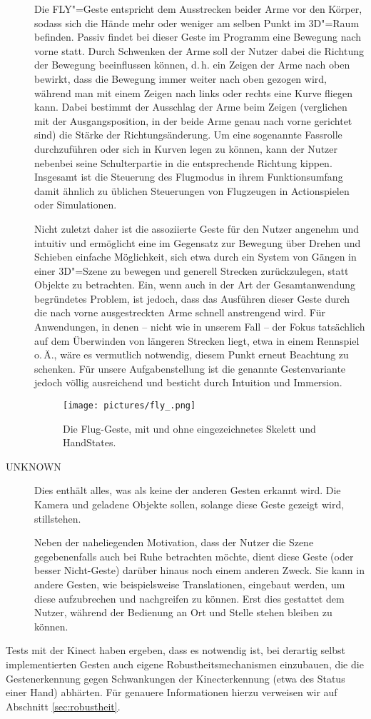 \begin{description}
		Die FLY"=Geste entspricht dem Ausstrecken beider Arme vor den Körper, sodass sich die Hände mehr oder weniger am selben Punkt im 3D"=Raum befinden. Passiv findet bei dieser Geste im Programm eine Bewegung nach vorne statt. Durch Schwenken der Arme soll der Nutzer dabei die Richtung der Bewegung beeinflussen können, d.\,h. ein Zeigen der Arme nach oben bewirkt, dass die Bewegung immer weiter nach oben gezogen wird, während man mit einem Zeigen nach links oder rechts eine Kurve fliegen kann. Dabei bestimmt der Ausschlag der Arme beim Zeigen (verglichen mit der Ausgangsposition, in der beide Arme genau nach vorne gerichtet sind) die Stärke der Richtungsänderung. Um eine sogenannte Fassrolle durchzuführen oder sich in Kurven legen zu können, kann der Nutzer nebenbei seine Schulterpartie in die entsprechende Richtung kippen. Insgesamt ist die Steuerung des Flugmodus in ihrem Funktionsumfang damit ähnlich zu üblichen Steuerungen von Flugzeugen in Actionspielen oder Simulationen.\par 
		Nicht zuletzt daher ist die assoziierte Geste für den Nutzer angenehm und intuitiv und ermöglicht eine im Gegensatz zur Bewegung über Drehen und Schieben einfache Möglichkeit, sich etwa durch ein System von Gängen in einer 3D"=Szene zu bewegen und generell Strecken zurückzulegen, statt Objekte zu betrachten. Ein, wenn auch in der Art der Gesamtanwendung begründetes Problem, ist jedoch, dass das Ausführen dieser Geste durch die nach vorne ausgestreckten Arme schnell anstrengend wird. Für Anwendungen, in denen -- nicht wie in unserem Fall -- der Fokus tatsächlich auf dem Überwinden von längeren Strecken liegt, etwa in einem Rennspiel o.\,Ä., wäre es vermutlich notwendig, diesem Punkt erneut Beachtung zu schenken. Für unsere Aufgabenstellung ist die genannte Gestenvariante jedoch völlig ausreichend und besticht durch Intuition und Immersion.
		\begin{figure}[h!]
		\centering
		\texttt{[image: pictures/fly\_.png]}
		\caption{Die Flug-Geste, mit und ohne eingezeichnetes Skelett und HandStates.}\label{fig:flyg}
		\end{figure}\par		
		\item[UNKNOWN] Dies enthält alles, was als keine der anderen Gesten erkannt wird. Die Kamera und geladene Objekte sollen, solange diese Geste gezeigt wird, stillstehen.\par
		Neben der naheliegenden Motivation, dass der Nutzer die Szene gegebenenfalls auch bei Ruhe betrachten möchte, dient diese \glqq Geste\grqq{} (oder besser \glqq Nicht-Geste\grqq{}) darüber hinaus noch einem anderen Zweck. Sie kann in andere Gesten, wie beispielsweise Translationen, eingebaut werden, um diese aufzubrechen und \glqq nachgreifen\grqq{} zu können. Erst dies gestattet dem Nutzer, während der Bedienung an Ort und Stelle stehen bleiben zu können.
	\end{description}
	Tests mit der Kinect haben ergeben, dass es notwendig ist, bei derartig selbst implementierten Gesten auch eigene Robustheitsmechanismen einzubauen, die die Gestenerkennung gegen Schwankungen der Kinecterkennung (etwa des Status einer Hand) abhärten. Für genauere Informationen hierzu verweisen wir auf Abschnitt \ref{sec:robustheit}.